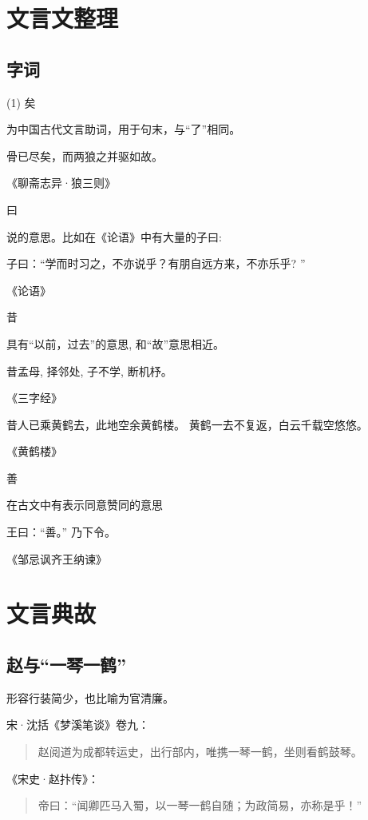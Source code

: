 
\section{文言文整理}

  \subsection{字词}

  \begin{tasks}[style=enumerate](1)
     \task 矣

     为中国古代文言助词，用于句末，与“了”相同。


     \epigraph{骨已尽矣，而两狼之并驱如故。}{《聊斋志异·狼三则》}

     \task 曰

     说的意思。比如在《论语》中有大量的子曰:

     \epigraph{子曰：“学而时习之，不亦说乎？有朋自远方来，不亦乐乎? ”}{《论语》}

     \task 昔

     具有``以前，过去''的意思, 和“故”意思相近。

     \epigraph{昔孟母, 择邻处, 子不学, 断机杼。}{《三字经》}

     \epigraph{昔人已乘黄鹤去，此地空余黄鹤楼。
黄鹤一去不复返，白云千载空悠悠。}{《黄鹤楼》}

     \task 善

     在古文中有表示同意赞同的意思

     \epigraph{王曰：“善。” 乃下令。}{《邹忌讽齐王纳谏》}


  \end{tasks}


\section{文言典故}

   \subsection{赵与``一琴一鹤''}

   形容行装简少，也比喻为官清廉。

   宋·沈括《梦溪笔谈》卷九：
   \begin{quotation}
      赵阅道为成都转运史，出行部内，唯携一琴一鹤，坐则看鹤鼓琴。
    \end{quotation}


   《宋史·赵抃传》：
     \begin{quotation}
        帝曰：``闻卿匹马入蜀，以一琴一鹤自随；为政简易，亦称是乎！''
     \end{quotation}